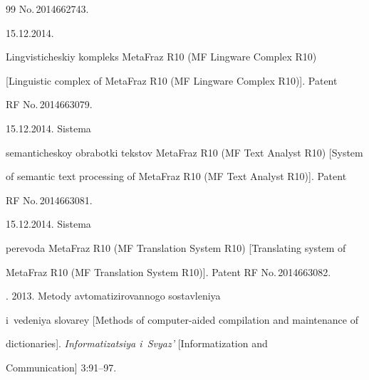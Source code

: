 {{\begin{thebibliography}{99}
No.\,2014662743.




 15.12.2014. 


Lingvisticheskiy kompleks MetaFraz R10 (MF Lingware Complex R10) 


[Linguistic complex of MetaFraz R10 (MF Lingware Complex R10)]. Patent 


RF No.\,2014663079. 




 15.12.2014. Sistema 


semanticheskoy obrabotki tekstov MetaFraz R10 (MF Text Analyst R10) [System 


of semantic text processing of MetaFraz R10 (MF Text Analyst R10)]. Patent 


RF No.\,2014663081. 







      15.12.2014. Sistema 


perevoda MetaFraz R10 (MF Translation System R10) [Translating system of 


MetaFraz R10 (MF Translation System R10)]. Patent RF No.\,2014663082.







.  2013. Metody avtomatizirovannogo sostavleniya 


i~vedeniya slovarey [Methods of computer-aided compilation and maintenance of 


dictionaries]. \textit{Informatizatsiya i~Svyaz'} [Informatization and 


Communication] 3:91--97.







\end{thebibliography}}}
